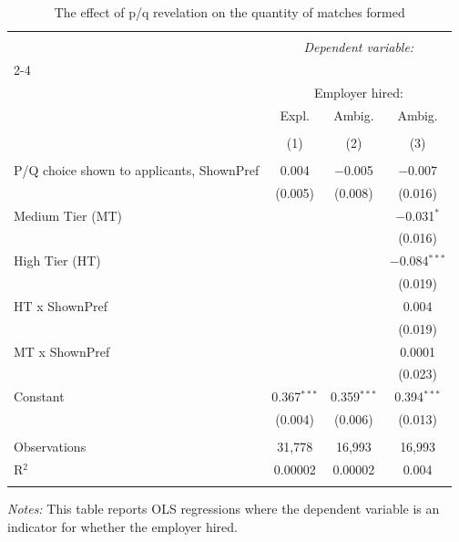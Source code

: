 
\begin{table}[!htbp] \centering 
  \caption{The effect of p/q revelation on the quantity of matches formed} 
  \label{tab:fills} 
\small 
\begin{tabular}{@{\extracolsep{5pt}}lccc} 
\\[-1.8ex]\hline 
\hline \\[-1.8ex] 
 & \multicolumn{3}{c}{\textit{Dependent variable:}} \\ 
\cline{2-4} 
\\[-1.8ex] & \multicolumn{3}{c}{Employer hired:} \\ 
 & Expl. & Ambig. & Ambig. \\ 
\\[-1.8ex] & (1) & (2) & (3)\\ 
\hline \\[-1.8ex] 
 P/Q choice shown to applicants, ShownPref & 0.004 & $-$0.005 & $-$0.007 \\ 
  & (0.005) & (0.008) & (0.016) \\ 
  Medium Tier (MT) &  &  & $-$0.031$^{*}$ \\ 
  &  &  & (0.016) \\ 
  High Tier (HT) &  &  & $-$0.084$^{***}$ \\ 
  &  &  & (0.019) \\ 
  HT x ShownPref &  &  & 0.004 \\ 
  &  &  & (0.019) \\ 
  MT x ShownPref &  &  & 0.0001 \\ 
  &  &  & (0.023) \\ 
  Constant & 0.367$^{***}$ & 0.359$^{***}$ & 0.394$^{***}$ \\ 
  & (0.004) & (0.006) & (0.013) \\ 
 \hline \\[-1.8ex] 
Observations & 31,778 & 16,993 & 16,993 \\ 
R$^{2}$ & 0.00002 & 0.00002 & 0.004 \\ 
\hline 
\hline \\[-1.8ex] 
\end{tabular}
\begin{minipage}{0.9\textwidth} 
 \emph{Notes:} This table reports OLS regressions where the dependent variable is an indicator for whether the employer hired. \starlanguage
 \end{minipage}
\end{table}
